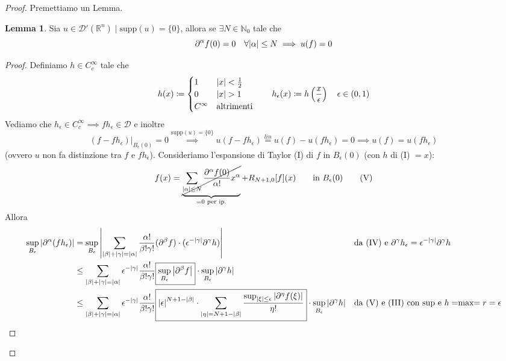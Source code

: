\documentclass[a4paper,10pt]{article}
\theoremstyle{definition}
\newcommand{\na}{\mathbb{N}} %
\newcommand{\re}{\mathbb{R}} %
\newcommand{\supp}{\text{supp}} %
\theoremstyle{indentdefinition}
\theoremstyle{indenttheorem}
\newtheorem{lem*}{Lemma}
\theoremstyle{myremark}
\theoremstyle{indentgeneral}
\begin{document}
\begin{proof} Premettiamo un Lemma.
    \begin{shaded}
        \begin{lem*}
            Sia $u\in\mathcal{D}'(\re^n)\mid\supp(u)=\{0\}$, allora se $\exists N\in\na_0$ tale che
            $$\partial^\alpha f(0)=0\quad \forall\abs{\alpha}\le N\implies u(f)=0$$
        \end{lem*}
        \begin{proof} Definiamo $h\in C^\infty_c$ tale che
        $$h(x)\coloneqq\begin{cases}
            1 & \abs{x}<\frac{1}{2}\\
            0 & \abs{x}>1\\
            C^\infty & \text{altrimenti}
        \end{cases}\qquad h_\epsilon(x)\coloneqq h\left(\frac{x}{\epsilon}\right)\quad \epsilon\in (0,1)$$
            Vediamo che $h_\epsilon\in C_c^\infty\implies fh_\epsilon\in \mathcal{D}$ e inoltre
            $$(f-fh_\epsilon)|_{B_\epsilon(0)}=0\overset{\supp(u)=\{0\}}{\implies}u(f-fh_\epsilon)\overset{lin}{=}u(f)-u(fh_\epsilon)=0\implies \boxed{u(f)=u(fh_\epsilon)}$$
            (ovvero $u$ non fa distinzione tra $f$ e $fh_\epsilon$). Consideriamo l'espansione di Taylor (I) di $f$ in $B_\epsilon(0)$ (con $h$ di (I)  $=x$):
            $$f(x)=\underbrace{\cancel{\sum_{\abs{\alpha}\le N}\frac{\partial^\alpha f(0)}{\alpha!}x^\alpha}}_{=0 \text{ per ip.}}+R_{N+1,0}[f](x)\qquad \text{in }B_\epsilon(0)\qquad \text{(V)}$$
            Allora
            \begin{align*}
                \sup_{B_\epsilon}\abs{\partial^\alpha(fh_\epsilon)}&=\sup_{B_\epsilon}\abs{\sum_{\abs{\beta}+\abs{\gamma}=\abs{\alpha}}\frac{\alpha!}{\beta!\gamma!}(\partial^\beta f)\cdot(\epsilon^{-\abs{\gamma}}\partial^\gamma h)}&& \text{da (IV) e }\partial^\gamma h_\epsilon=\epsilon^{-\abs{\gamma}}\partial^\gamma h\\
                &\le\sum_{\abs{\beta}+\abs{\gamma}=\abs{\alpha}}\epsilon^{-\abs{\gamma}}\frac{\alpha!}{\beta!\gamma!}\boxed{\sup_{B_\epsilon}\abs{{\partial^\beta f}}}\cdot\sup_{B_\epsilon}\abs{\partial^\gamma h}\\
                &\le   \sum_{\abs{\beta}+\abs{\gamma}=\abs{\alpha}}\epsilon^{-\abs{\gamma}}\frac{\alpha!}{\beta!\gamma!}\boxed{\abs{\epsilon}^{N+1-\abs{\beta}}\cdot\sum_{\abs{\eta}=N+1-\abs{\beta}}\frac{\sup_{\abs{\xi}\le\epsilon}\abs{\partial^\eta f(\xi)}}{\eta!}}\cdot\sup_{B_\epsilon}\abs{\partial^\gamma h} && \text{da (V) e (III) con sup e $h=$max$=r=\epsilon$}\\

\end{align*}
\end{proof}
\end{shaded}
\end{proof}
\end{document}
